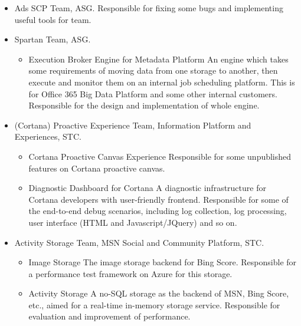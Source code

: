 \documentclass[10pt,a4paper,roman]{moderncv} %
\begin{document}
        {\begin{itemize}%
         \item Ads SCP Team, ASG.
               Responsible for fixing some bugs and implementing useful tools for team.
         \item Spartan Team, ASG.
               \begin{itemize}%
               \item Execution Broker Engine for Metadata Platform\newline{}%
                     An engine which takes some requirements of moving data from one storage to another, then execute and monitor them on an internal job scheduling platform. This is for Office 365 Big Data Platform and some other internal customers.\newline{}%
                     Responsible for the design and implementation of whole engine.
               \end{itemize}
         \item (Cortana) Proactive Experience Team, Information Platform and Experiences, STC.
               \begin{itemize}%
               \item Cortana Proactive Canvas Experience\newline{}%
                     Responsible for some unpublished features on Cortana proactive canvas.
               \item Diagnostic Dashboard for Cortana\newline{}%
                     A diagnostic infrastructure for Cortana developers with user-friendly frontend.\newline{}%
                     Responsible for some of the end-to-end debug scenarios, including log collection, log processing, user interface (HTML and Javascript/JQuery) and so on.
               \end{itemize}
         \item Activity Storage Team, MSN Social and Community Platform, STC.
               \begin{itemize}%
               \item Image Storage\newline{}%
                     The image storage backend for Bing Score.\newline{}%
                     Responsible for a performance test framework on Azure for this storage.
               \item Activity Storage\newline{}%
                     A no-SQL storage as the backend of MSN, Bing Score, etc., aimed for a real-time in-memory storage service.\newline{}%
                     Responsible for evaluation and improvement of performance.
               \end{itemize}
         \end{itemize}}
\end{document}
